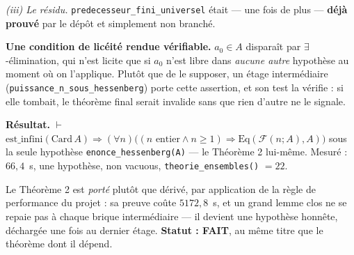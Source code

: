 \emph{(iii) Le résidu.} \texttt{predecesseur\_fini\_universel} était --- une fois
de plus --- \textbf{déjà prouvé} par le dépôt et simplement non branché.

\textbf{Une condition de licéité rendue vérifiable.} $a_0 \in A$ disparaît par
$\exists$-élimination, qui n'est licite que si $a_0$ n'est libre dans
\emph{aucune autre} hypothèse au moment où on l'applique. Plutôt que de le
supposer, un étage intermédiaire (\texttt{puissance\_n\_sous\_hessenberg}) porte
cette assertion, et son test la vérifie : si elle tombait, le théorème final
serait invalide sans que rien d'autre ne le signale.

\textbf{Résultat.} $\vdash$ $\mathrm{est\_infini}(\mathrm{Card}\,A) \Rightarrow
(\forall n)\big((n \text{ entier} \wedge n \ge 1) \Rightarrow
\mathrm{Eq}(\mathcal{F}(n;A), A)\big)$ sous la seule hypothèse
\texttt{enonce\_hessenberg(A)} --- le Théorème 2 lui-même. Mesuré : $66{,}4$~s,
une hypothèse, non vacuous, \texttt{theorie\_ensembles()} $= 22$.

Le Théorème 2 est \emph{porté} plutôt que dérivé, par application de la règle de
performance du projet : sa preuve coûte $5172{,}8$~s, et un grand lemme clos ne
se repaie pas à chaque brique intermédiaire --- il devient une hypothèse
honnête, déchargée une fois au dernier étage. \textbf{Statut : FAIT}, au même
titre que le théorème dont il dépend.
